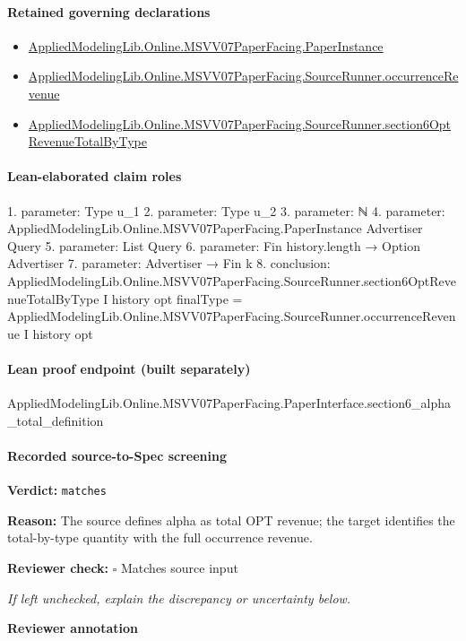 \documentclass[10pt]{article}
\newcommand{\reviewerbox}{%
  \par\noindent\fbox{\parbox{0.96\linewidth}{\rule{0pt}{0.38in}}}\par
}
\newcommand{\reviewmatch}[1]{%
  \par\noindent\textbf{Reviewer check:} $\square$\; #1\par
  \noindent\emph{If left unchecked, explain the discrepancy or uncertainty below.}\par
}
\begin{document}
\paragraph{Retained governing declarations}
\begin{itemize}\raggedright
\item \hyperlink{governing-declaration-11907576ec71eeb5}{Applied\allowbreak{}Modeling\allowbreak{}Lib.\allowbreak{}Online.\allowbreak{}MSVV07\allowbreak{}Paper\allowbreak{}Facing.\allowbreak{}Paper\allowbreak{}Instance}
\item \hyperlink{governing-declaration-b66a923a19ae6243}{Applied\allowbreak{}Modeling\allowbreak{}Lib.\allowbreak{}Online.\allowbreak{}MSVV07\allowbreak{}Paper\allowbreak{}Facing.\allowbreak{}Source\allowbreak{}Runner.\allowbreak{}occurrence\allowbreak{}Revenue}
\item \hyperlink{governing-declaration-47d6db1865bbbcd6}{Applied\allowbreak{}Modeling\allowbreak{}Lib.\allowbreak{}Online.\allowbreak{}MSVV07\allowbreak{}Paper\allowbreak{}Facing.\allowbreak{}Source\allowbreak{}Runner.\allowbreak{}section6\allowbreak{}Opt\allowbreak{}Revenue\allowbreak{}Total\allowbreak{}By\allowbreak{}Type}
\end{itemize}
\paragraph{Lean-elaborated claim roles}\begin{ReviewVerbatim}
1. parameter: Type u_1
2. parameter: Type u_2
3. parameter: ℕ
4. parameter: AppliedModelingLib.Online.MSVV07PaperFacing.PaperInstance Advertiser Query
5. parameter: List Query
6. parameter: Fin history.length → Option Advertiser
7. parameter: Advertiser → Fin k
8. conclusion: AppliedModelingLib.Online.MSVV07PaperFacing.SourceRunner.section6OptRevenueTotalByType I history opt finalType =
  AppliedModelingLib.Online.MSVV07PaperFacing.SourceRunner.occurrenceRevenue I history opt
\end{ReviewVerbatim}

\paragraph{Lean proof endpoint (built separately)}\begin{ReviewVerbatim}
AppliedModelingLib.Online.MSVV07PaperFacing.PaperInterface.section6_alpha_total_definition
\end{ReviewVerbatim}

\paragraph{Recorded source-to-Spec screening}
\textbf{Verdict:} \texttt{matches}
\\
{\raggedright
\textbf{Reason:} The source defines alpha as total OPT revenue;\allowbreak{} the target identifies the total-\allowbreak{}by-\allowbreak{}type quantity with the full occurrence revenue.\allowbreak{}
\par}
\reviewmatch{Matches source input}
\noindent\textbf{Reviewer annotation}\par
\reviewerbox
\clearpage
\hypertarget{source-claim-4be68a9e83c05fd2}{}
\end{document}
